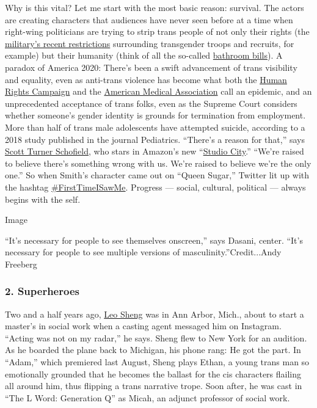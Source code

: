 Why is this vital? Let me start with the most basic reason: survival.
The actors are creating characters that audiences have never seen before
at a time when right-wing politicians are trying to strip trans people
of not only their rights (the
\href{https://www.nytimes3xbfgragh.onion/2018/07/05/us/military-transgender-recruits.html}{military's
recent restrictions} surrounding transgender troops and recruits, for
example) but their humanity (think of all the so-called
\href{https://www.nytimes3xbfgragh.onion/2019/07/23/us/north-carolina-transgender-bathrooms.html}{bathroom
bills}). A paradox of America 2020: There's been a swift advancement of
trans visibility and equality, even as anti-trans violence has become
what both the
\href{https://www.hrc.org/resources/a-national-epidemic-fatal-anti-trans-violence-in-the-united-states-in-2019}{Human
Rights Campaign} and the
\href{https://www.nytimes3xbfgragh.onion/2019/09/27/us/transgender-women-deaths.html}{American
Medical Association} call an epidemic, and an unprecedented acceptance
of trans folks, even as the Supreme Court considers whether someone's
gender identity is grounds for termination from employment. More than
half of trans male adolescents have attempted suicide, according to a
2018 study published in the journal Pediatrics. ``There's a reason for
that,'' says \href{https://www.scotttschofield.com/}{Scott Turner
Schofield}, who stars in Amazon's new
``\href{https://www.amazon.com/Studio-City/dp/B0831S9K6R}{Studio
City}.'' ``We're raised to believe there's something wrong with us.
We're raised to believe we're the only one.'' So when Smith's character
came out on ``Queen Sugar,'' Twitter lit up with the hashtag
\href{https://www.instagram.com/explore/tags/firsttimeisawme/}{\#FirstTimeISawMe}.
Progress --- social, cultural, political --- always begins with the
self.

Image

``It's necessary for people to see themselves onscreen,'' says Dasani,
center. ``It's necessary for people to see multiple versions of
masculinity.''Credit...Andy Freeberg

\hypertarget{2-superheroes}{%
\subsubsection{2. Superheroes}\label{2-superheroes}}

Two and a half years ago, \href{https://www.leosheng.com/}{Leo Sheng}
was in Ann Arbor, Mich., about to start a master's in social work when a
casting agent messaged him on Instagram. ``Acting was not on my radar,''
he says. Sheng flew to New York for an audition. As he boarded the plane
back to Michigan, his phone rang: He got the part. In ``Adam,'' which
premiered last August, Sheng plays Ethan, a young trans man so
emotionally grounded that he becomes the ballast for the cis characters
flailing all around him, thus flipping a trans narrative trope. Soon
after, he was cast in ``The L Word: Generation Q'' as Micah, an adjunct
professor of social work.

